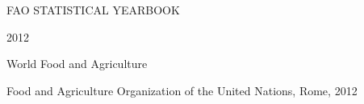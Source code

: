 \onecolumn


\vspace*{100pt}
\begin{center}
\Huge{FAO STATISTICAL YEARBOOK}
\end{center}


\vspace*{10pt}
\begin{center}
\Huge{2012}
\end{center}

\vspace*{10pt}
\begin{center}
\Huge{World Food and Agriculture}
\end{center}

\vfill
\begin{center}
Food and Agriculture Organization of the United Nations, Rome, 2012 
\end{center}



\newpage
